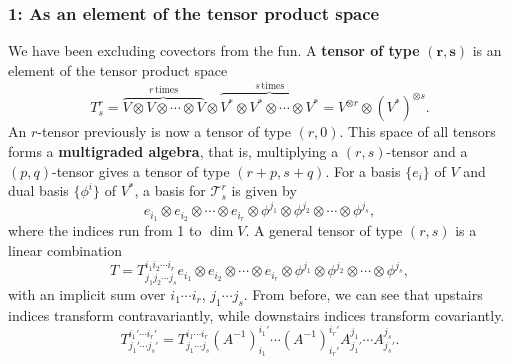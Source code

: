 \subsubsection*{1: As an element of the tensor product space} 
We have been excluding covectors from the fun. A \textbf{tensor of type} $\mathbf {(r,s)} $ is an element of the tensor product space \[
    T_s^r=\overset{r\, \text{times} }{\overbrace{V\otimes V\otimes \cdots \otimes V} } \otimes \overset{s \, \text{times} }{\overbrace{V^*\otimes V^*\otimes \cdots \otimes V^*} } =V^{\otimes r}\otimes (V^*)^{\otimes s}.
\] An $r$-tensor previously is now a tensor of type $(r,0)$. This space of all tensors forms a \textbf{multigraded algebra}, that is, multiplying a $(r,s)$-tensor and a $(p,q)$-tensor gives a tensor of type $(r+p,s+q)$. For a basis $\{e_i \} $ of $V$ and dual basis $\{\phi^i \} $ of $V^*$, a basis for $\mathcal{T} _s^r$ is given by \[
e_{i_1}\otimes e_{i_2}\otimes \cdots \otimes e_{i_r}\otimes \phi^{j_1}\otimes \phi^{j_2}\otimes \cdots \otimes \phi^{j_s},
\] where the indices run from 1 to $\dim V$. A general tensor of type $(r,s)$ is a linear combination \[
T=T^{i_1i_2\cdots i_r}_{j_1j_2\cdots j_s}e_{i_1}\otimes e_{i_2}\otimes \cdots \otimes e_{i_r}\otimes \phi^{j_1}\otimes \phi^{j_2}\otimes \cdots \otimes \phi^{j_s},
\] with an implicit sum over $i_1\cdots i_r$, $j_1\cdots j_s$. From before, we can see that upstairs indices transform contravariantly, while downstairs indices transform covariantly. \[
T^{i_1'\cdots i_r'}_{j_1'\cdots j_s'}=T^{i_1\cdots i_r}_{j_1\cdots j_s}(A^{-1})^{i_1'}_{i_1}\cdots (A^{-1})^{i_r'}_{i_r'}A^{j_1}_{j_1'}\cdots A^{j_s}_{j_s'}.
\] 
